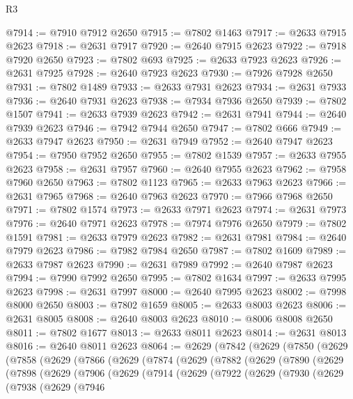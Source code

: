 \begin{lexlean}{R3}
\begin{coremodule}
@7914 := @7910 @7912 @2650
@7915 := @7802 @1463
@7917 := @2633 @7915 @2623
@7918 := @2631 @7917
@7920 := @2640 @7915 @2623
@7922 := @7918 @7920 @2650
@7923 := @7802 @693
@7925 := @2633 @7923 @2623
@7926 := @2631 @7925
@7928 := @2640 @7923 @2623
@7930 := @7926 @7928 @2650
@7931 := @7802 @1489
@7933 := @2633 @7931 @2623
@7934 := @2631 @7933
@7936 := @2640 @7931 @2623
@7938 := @7934 @7936 @2650
@7939 := @7802 @1507
@7941 := @2633 @7939 @2623
@7942 := @2631 @7941
@7944 := @2640 @7939 @2623
@7946 := @7942 @7944 @2650
@7947 := @7802 @666
@7949 := @2633 @7947 @2623
@7950 := @2631 @7949
@7952 := @2640 @7947 @2623
@7954 := @7950 @7952 @2650
@7955 := @7802 @1539
@7957 := @2633 @7955 @2623
@7958 := @2631 @7957
@7960 := @2640 @7955 @2623
@7962 := @7958 @7960 @2650
@7963 := @7802 @1123
@7965 := @2633 @7963 @2623
@7966 := @2631 @7965
@7968 := @2640 @7963 @2623
@7970 := @7966 @7968 @2650
@7971 := @7802 @1574
@7973 := @2633 @7971 @2623
@7974 := @2631 @7973
@7976 := @2640 @7971 @2623
@7978 := @7974 @7976 @2650
@7979 := @7802 @1591
@7981 := @2633 @7979 @2623
@7982 := @2631 @7981
@7984 := @2640 @7979 @2623
@7986 := @7982 @7984 @2650
@7987 := @7802 @1609
@7989 := @2633 @7987 @2623
@7990 := @2631 @7989
@7992 := @2640 @7987 @2623
@7994 := @7990 @7992 @2650
@7995 := @7802 @1634
@7997 := @2633 @7995 @2623
@7998 := @2631 @7997
@8000 := @2640 @7995 @2623
@8002 := @7998 @8000 @2650
@8003 := @7802 @1659
@8005 := @2633 @8003 @2623
@8006 := @2631 @8005
@8008 := @2640 @8003 @2623
@8010 := @8006 @8008 @2650
@8011 := @7802 @1677
@8013 := @2633 @8011 @2623
@8014 := @2631 @8013
@8016 := @2640 @8011 @2623
@8064 := @2629
    (@7842
      (@2629
        (@7850
          (@2629
            (@7858
              (@2629
                (@7866
                  (@2629
                    (@7874
                      (@2629
                        (@7882
                          (@2629
                            (@7890
                              (@2629
                                (@7898
                                  (@2629
                                    (@7906
                                      (@2629
                                        (@7914
                                          (@2629
                                            (@7922
                                              (@2629
                                                (@7930
                                                  (@2629
                                                    (@7938
                                                      (@2629
                                                        (@7946

\end{coremodule}
\end{lexlean}
